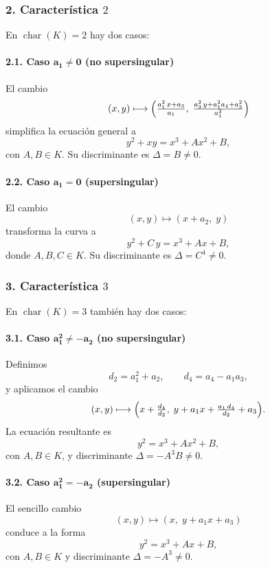 \subsubsection*{2. Característica $2$}

En $\operatorname{char}(K)=2$ hay dos casos:

\paragraph*{2.1. Caso $\boldsymbol{a_1\neq0}$ (no supersingular)}  
El cambio
\[
(x,y)\longmapsto\Bigl(\tfrac{a_1^2\,x + a_3}{a_1},\;\tfrac{a_3^2\,y + a_1^2a_4 + a_3^2}{a_1^2}\Bigr)
\]
simplifica la ecuación general a
\begin{equation}\label{eq:f2m_nonsupersingular}
y^2 + xy = x^3 + A x^2 + B,
\end{equation}
con $A,B\in K$. Su discriminante es $\Delta = B\neq0$.

\paragraph*{2.2. Caso $\boldsymbol{a_1=0}$ (supersingular)}  
El cambio
\[
(x,y)\longmapsto(x + a_2,\;y)
\]
transforma la curva a
\begin{equation}\label{eq:f2m_supersingular}
y^2 + C\,y = x^3 + A x + B,
\end{equation}
donde $A,B,C\in K$. Su discriminante es $\Delta = C^4\neq0$.

\subsubsection*{3. Característica $3$}

En $\operatorname{char}(K)=3$ también hay dos casos:

\paragraph*{3.1. Caso $\boldsymbol{a_1^2 \neq -a_2}$ (no supersingular)}  
Definimos
\[
d_2 = a_1^2 + a_2,\qquad d_4 = a_4 - a_1a_3,
\]
y aplicamos el cambio
\[
(x,y)\longmapsto\Bigl(x + \tfrac{d_4}{d_2},\;y + a_1x + \tfrac{a_1\,d_4}{d_2} + a_3\Bigr).
\]
La ecuación resultante es
\begin{equation}\label{eq:f3_nonsupersingular}
y^2 = x^3 + A x^2 + B,
\end{equation}
con $A,B\in K$, y discriminante $\Delta = -A^3B\neq0$.

\paragraph*{3.2. Caso $\boldsymbol{a_1^2 = -a_2}$ (supersingular)}  
El sencillo cambio
\[
(x,y)\longmapsto(x,\;y + a_1x + a_3)
\]
conduce a la forma
\begin{equation}\label{eq:f3_supersingular}
y^2 = x^3 + A x + B,
\end{equation}
con $A,B\in K$ y discriminante $\Delta = -A^3\neq0$.

